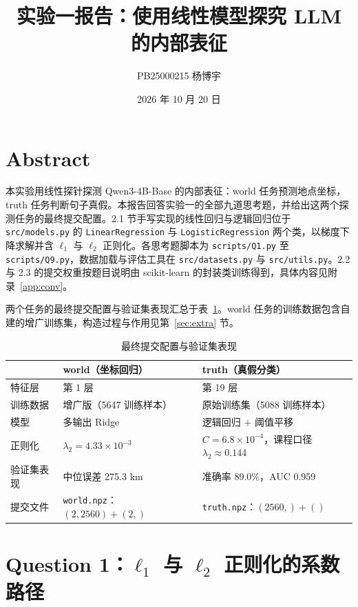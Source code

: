 \documentclass[UTF8,11pt,a4paper]{article}
\title{\textbf{实验一报告：使用线性模型探究 LLM 的内部表征}}
\author{PB25000215 杨博宇}
\date{2026 年 10 月 20 日}
\begin{document}
\maketitle

\section{Abstract}

本实验用线性探针探测 Qwen3-4B-Base 的内部表征：world 任务预测地点坐标，truth 任务判断句子真假。本报告回答实验一的全部九道思考题，并给出这两个探测任务的最终提交配置。2.1 节手写实现的线性回归与逻辑回归位于 \texttt{src/models.py} 的 \texttt{LinearRegression} 与 \texttt{LogisticRegression} 两个类，以梯度下降求解并含 $\ell_1$ 与 $\ell_2$ 正则化。各思考题脚本为 \texttt{scripts/Q1.py} 至 \texttt{scripts/Q9.py}，数据加载与评估工具在 \texttt{src/datasets.py} 与 \texttt{src/utils.py}。2.2 与 2.3 的提交权重按题目说明由 scikit-learn 的封装类训练得到，具体内容见附录~\ref{app:conv}。

两个任务的最终提交配置与验证集表现汇总于表~\ref{tab:final}。world 任务的训练数据包含自建的增广训练集，构造过程与作用见第~\ref{sec:extra} 节。

\begin{table}[H]
\centering
\caption{最终提交配置与验证集表现}
\label{tab:final}
\begin{tabular}{lll}
\toprule
 & world（坐标回归） & truth（真假分类） \\
\midrule
特征层 & 第 1 层 & 第 19 层 \\
训练数据 & 增广版（5647 训练样本） & 原始训练集（5088 训练样本） \\
模型 & 多输出 Ridge & 逻辑回归 + 阈值平移 \\
正则化 & $\lambda_2 = 4.33\times10^{-3}$ & $C = 6.8\times10^{-4}$，课程口径 $\lambda_2 \approx 0.144$ \\
验证集表现 & 中位误差 275.3 km & 准确率 89.0\%，AUC 0.959 \\
提交文件 & \texttt{world.npz}：$(2,2560)+(2,)$ & \texttt{truth.npz}：$(2560,)+()$ \\
\bottomrule
\end{tabular}
\end{table}

\section{Question 1：\texorpdfstring{$\ell_1$}{L1} 与 \texorpdfstring{$\ell_2$}{L2} 正则化的系数路径}
\end{document}

